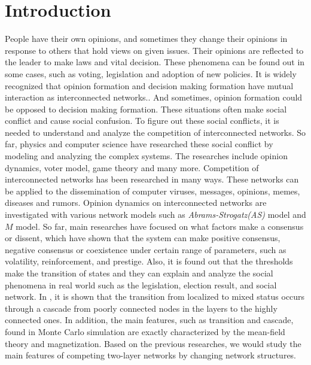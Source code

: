 
\chapter{Introduction}
\label{chap:intro}
People have their own opinions, and sometimes they change their opinions in response to others that hold views on given issues. Their opinions are reflected to the leader to make laws and vital decision. These phenomena can be found out  in some cases, such as voting, legislation and adoption of new policies. It is widely recognized that opinion formation and decision making formation have mutual interaction as interconnected networks.\cite{mikko2013, danziger2019, newman2010, boccaletti2014, domenico2013, tomasini2015, namkhanhvu2017}. And sometimes, opinion formation could be opposed to decision making formation. These situations often make social conflict and cause social confusion. To figure out these social conflicts, it is needed to understand and analyze the competition of interconnected networks. So far, physics and computer science have researched these social conflict by modeling and analyzing the complex systems\cite{huberman2004, zuev2012, laguna2004, masuda2015}. The researches include opinion dynamics, voter model, game theory and many more\cite{bianconi2018}. 
Competition of interconnected networks has been researched in many ways. These networks can be applied to the dissemination of computer viruses, messages, opinions, memes, diseases and rumors\cite{hua2014,shenyu2018, zhou2018, alvarez2016,gomez2015,diep2017,rocca2014,velasquez2018}. Opinion dynamics on interconnected networks are investigated with various network models such as \textit{Abrams-Strogatz(AS)} model\cite{abrams2003,vazquez2010} and $M$ model\cite{rocca2014}. So far, main researches have focused on what factors make a consensus or dissent, which have shown that the system can make positive consensus, negative consensus or coexistence under certain range of parameters, such as volatility, reinforcement, and prestige. Also, it is found out that the thresholds make the transition of states and they can explain and analyze the social phenomena in real world such as the legislation, election result, and social network\cite{alvarez2016, amato2017, diep2017}. In \cite{gomez2015}, it is shown that the transition from localized to mixed status occurs through a cascade from poorly connected nodes in the layers to the highly connected ones. In addition, the main features, such as transition and cascade, found in Monte Carlo simulation are exactly characterized by the mean-field theory and magnetization\cite{alvarez2016, diep2017, amato2017, gomez2015}. Based on the previous researches, we would study the main features of competing two-layer networks by changing network structures. 

